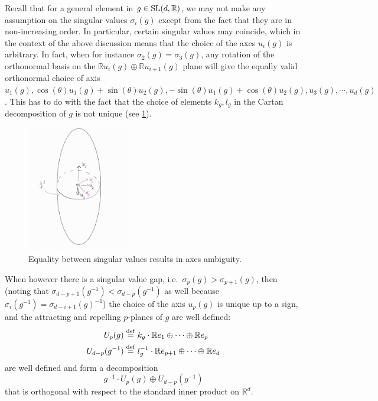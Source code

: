 \documentclass{report}
\begin{document}
Recall that for a general element in $g \in \operatorname{{\mathrm{SL}}}(d, \mathbb R)$, we may not make any assumption on the singular values $\sigma_i(g)$ except from the fact that they are in non-increasing order.
In particular, certain singular values may coincide, which in the context of the above discussion means that the choice of the axes $u_i(g)$ is arbitrary.
In fact, when for instance $\sigma_2(g) = \sigma_3(g)$, any rotation of the orthonormal basis on the $\mathbb R u_i(g) \oplus \mathbb R u_{i+1}(g)$ plane will give the equally valid orthonormal choice of axis $u_1(g), \cos(\theta) u_1(g) + \sin(\theta) u_2(g), -\sin(\theta) u_1(g) + \cos(\theta) u_2(g), u_3(g), \cdots, u_d(g)$.
This has to do with the fact that the choice of elements $k_g, l_g$ in the Cartan decomposition of $g$ is not unique (see \cref{fig:arbitrary_axis}).
\begin{figure}[h]
    \centering
    \includegraphics[width=0.4\textwidth]{arbitrary_axis.jpg}
    \caption{Equality between singular values results in axes ambiguity.}
    \label{fig:arbitrary_axis}
\end{figure}

When however there is a singular value gap, i.e.\ $\sigma_p(g) > \sigma_{p+1}(g)$, then (noting that $\sigma_{d-p+1}(g^{-1}) < \sigma_{d-p}(g^{-1})$ as well because $\sigma_i(g^{-1}) = \sigma_{d-i + 1}(g)^{-1}$) the choice of the axis $u_p(g)$ is unique up to a sign, and the attracting and repelling $p$-planes of $g$ are well defined:
\begin{align*}
    U_p(g) &\overset{\mathrm{def}}{=} k_g \cdot \mathbb R e_1 \oplus \cdots \oplus \mathbb R e_p\\
    U_{d-p}(g^{-1}) &\overset{\mathrm{def}}{=} l_g^{-1} \cdot \mathbb R e_{p+1} \oplus \cdots \oplus \mathbb R e_d\\
\end{align*}
are well defined and form a decomposition
\[
    g^{-1} \cdot U_p(g) \oplus U_{d-p}(g^{-1})
\]
that is orthogonal with respect to the standard inner product on $\mathbb R^d$. 
\end{document}
